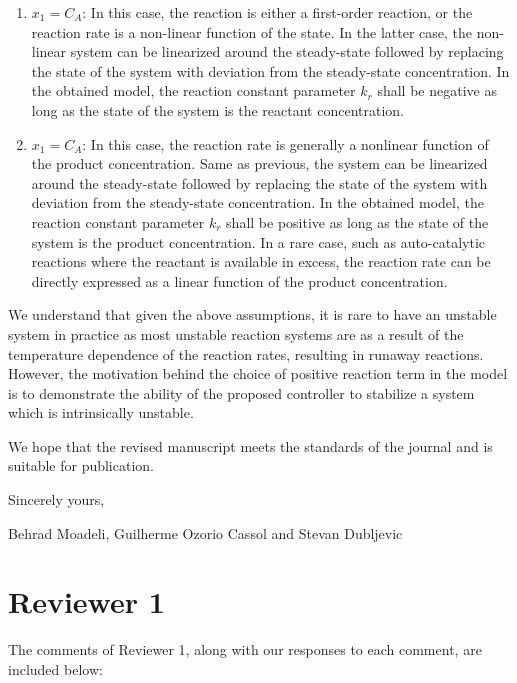 \documentclass[10pt,answers]{exam}
\begin{document}
\begin{enumerate}
    \item  $x_1 = C_A$: In this case, the reaction is either a first-order reaction, or the reaction rate is a non-linear function of the state. In the latter case, the non-linear system can be linearized around the steady-state followed by replacing the state of the system with deviation from the steady-state concentration. In the obtained model, the reaction constant parameter $k_r$ shall be negative as long as the state of the system is the reactant concentration. 
    \item $x_1 = C_A$: In this case, the reaction rate is generally a nonlinear function of the product concentration. Same as previous, the system can be linearized around the steady-state followed by replacing the state of the system with deviation from the steady-state concentration. In the obtained model, the reaction constant parameter $k_r$ shall be positive as long as the state of the system is the product concentration. In a rare case, such as auto-catalytic reactions where the reactant is available in excess, the reaction rate can be directly expressed as a linear function of the product concentration.
    
\end{enumerate}

We understand that given the above assumptions, it is rare to have an unstable system in practice as most unstable reaction systems are as a result of the temperature dependence of the reaction rates, resulting in runaway reactions. However, the motivation behind the choice of positive reaction term in the model is to demonstrate the ability of the proposed controller to stabilize a system which is intrinsically unstable. 

We hope that the revised manuscript meets the standards of the journal and is suitable for publication. 

\vspace{1em}
Sincerely yours,

Behrad Moadeli, Guilherme Ozorio Cassol and Stevan Dubljevic
\newpage

\section*{Reviewer 1}

The comments of Reviewer 1, along with our responses to each comment, are included below:
\end{document}
